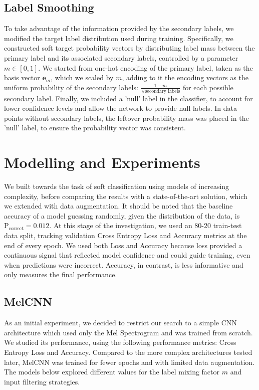 \documentclass[10pt]{article}
\begin{document}
\subsection*{Label Smoothing}

To take advantage of the information provided by the secondary labels, we modified the target label distribution used during training. Specifically, we constructed soft target probability vectors by distributing label mass between the primary label and its associated secondary labels, controlled by a parameter $m \in [0,1]$. We started from one-hot encoding of the primary label, taken as the basis vector $\mathbf{e}_m$, which we scaled by $m$, adding to it the encoding vectors as the uniform probability of the secondary labels: $\frac{1-m}{\#\text{secondary labels}}$ for each possible secondary label. Finally, we included a 'null' label in the classifier, to account for lower confidence levels and allow the network to provide null labels. In data points without secondary labels, the leftover probability mass was placed in the 'null' label, to ensure the probability vector was consistent.

\section*{Modelling and Experiments}

We built towards the task of soft classification using models of increasing complexity, before comparing the results with a state-of-the-art solution, which we extended with data augmentation. It should be noted that the baseline accuracy of a model guessing randomly, given the distribution of the data, is $\text{P}_\text{correct} = 0.012$. At this stage of the investigation, we used an 80-20 train-test data split, tracking validation Cross Entropy Loss and Accuracy metrics at the end of every epoch. We used both Loss and Accuracy because loss provided a continuous signal that reflected model confidence and could guide training, even when predictions were incorrect. Accuracy, in contrast, is less informative and only measures the final performance.

\subsection*{MelCNN}

As an initial experiment, we decided to restrict our search to a simple CNN architecture which used only the Mel Spectrogram and was trained from scratch. We studied its performance, using the following performance metrics: Cross Entropy Loss and Accuracy. Compared to the more complex architectures tested later, MelCNN was trained for fewer epochs and with limited data augmentation. The models below explored different values for the label mixing factor $m$ and input filtering strategies.
\end{document}
